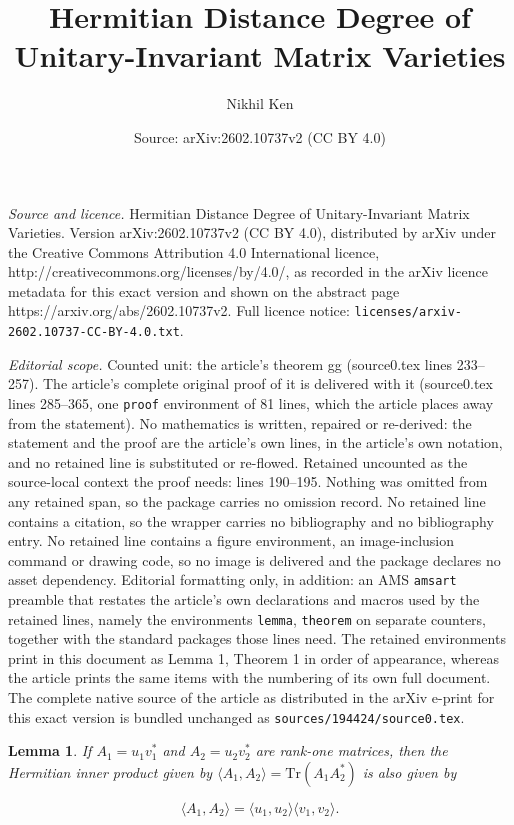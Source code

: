 \documentclass[10pt,a4paper]{amsart}
\title{Hermitian Distance Degree of Unitary-Invariant Matrix Varieties}
\author{Nikhil Ken}
\date{Source: arXiv:2602.10737v2 (CC BY 4.0)}
\newtheorem{lemma}{Lemma}
\begin{document}
\maketitle

\noindent\emph{Source and licence.} Hermitian Distance Degree of Unitary-Invariant Matrix Varieties. Version arXiv:2602.10737v2 (CC BY 4.0), distributed by arXiv under the Creative Commons Attribution 4.0 International licence, http://creativecommons.org/licenses/by/4.0/, as recorded in the arXiv licence metadata for this exact version and shown on the abstract page https://arxiv.org/abs/2602.10737v2. Full licence notice: \texttt{licenses/arxiv-2602.10737-CC-BY-4.0.txt}.\par\smallskip

\noindent\textit{Editorial scope.} Counted unit: the article's theorem gg (source0.tex lines 233--257). The article's complete original proof of it is delivered with it (source0.tex lines 285--365, one \texttt{proof} environment of 81 lines, which the article places away from the statement). No mathematics is written, repaired or re-derived: the statement and the proof are the article's own lines, in the article's own notation, and no retained line is substituted or re-flowed.  Retained uncounted as the source-local context the proof needs: lines 190--195.  Nothing was omitted from any retained span, so the package carries no omission record.  No retained line contains a citation, so the wrapper carries no bibliography and no bibliography entry.  No retained line contains a figure environment, an image-inclusion command or drawing code, so no image is delivered and the package declares no asset dependency.  Editorial formatting only, in addition: an AMS \texttt{amsart} preamble that restates the article's own declarations and macros used by the retained lines, namely the environments \texttt{lemma}, \texttt{theorem} on separate counters, together with the standard packages those lines need.  The retained environments print in this document as Lemma 1, Theorem 1 in order of appearance, whereas the article prints the same items with the numbering of its own full document.  The complete native source of the article as distributed in the arXiv e-print for this exact version is bundled unchanged as \texttt{sources/194424/source0.tex}.
\begin{lemma}\label{a}
   If $A_1 = u_1 v_1^*$ and $A_2 = u_2 v_2^*$ are rank-one matrices, then the Hermitian inner product given by $\langle A_1, A_2 \rangle = \mathrm{Tr}(A_1 A_2^*)$ is also given by

$$
\langle A_1, A_2 \rangle = \langle u_1, u_2 \rangle \langle v_1, v_2 \rangle.
$$\end{lemma}
\end{document}
